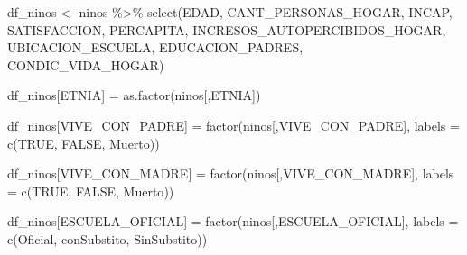 \documentclass[
]{article}
\newenvironment{Shaded}{\begin{snugshade}}{\end{snugshade}}
\newcommand{\AttributeTok}[1]{\textcolor[rgb]{0.77,0.63,0.00}{#1}}
\newcommand{\ConstantTok}[1]{\textcolor[rgb]{0.00,0.00,0.00}{#1}}
\newcommand{\FunctionTok}[1]{\textcolor[rgb]{0.00,0.00,0.00}{#1}}
\newcommand{\NormalTok}[1]{#1}
\newcommand{\OtherTok}[1]{\textcolor[rgb]{0.56,0.35,0.01}{#1}}
\newcommand{\SpecialCharTok}[1]{\textcolor[rgb]{0.00,0.00,0.00}{#1}}
\newcommand{\StringTok}[1]{\textcolor[rgb]{0.31,0.60,0.02}{#1}}
\begin{document}
\begin{Shaded}
\begin{Highlighting}[]
\NormalTok{df\_ninos }\OtherTok{\textless{}{-}}\NormalTok{ ninos }\SpecialCharTok{\%\textgreater{}\%} \FunctionTok{select}\NormalTok{(EDAD, CANT\_PERSONAS\_HOGAR, INCAP, SATISFACCION, }
\NormalTok{                             PERCAPITA, INCRESOS\_AUTOPERCIBIDOS\_HOGAR, }
\NormalTok{                             UBICACION\_ESCUELA, EDUCACION\_PADRES,}
\NormalTok{                             CONDIC\_VIDA\_HOGAR)}

\NormalTok{df\_ninos[}\StringTok{\textquotesingle{}ETNIA\textquotesingle{}}\NormalTok{] }\OtherTok{=} \FunctionTok{as.factor}\NormalTok{(ninos[,}\StringTok{\textquotesingle{}ETNIA\textquotesingle{}}\NormalTok{])}

\NormalTok{df\_ninos[}\StringTok{\textquotesingle{}VIVE\_CON\_PADRE\textquotesingle{}}\NormalTok{] }\OtherTok{=} \FunctionTok{factor}\NormalTok{(ninos[,}\StringTok{\textquotesingle{}VIVE\_CON\_PADRE\textquotesingle{}}\NormalTok{], }\AttributeTok{labels =} \FunctionTok{c}\NormalTok{(}\ConstantTok{TRUE}\NormalTok{, }
                                                                         \ConstantTok{FALSE}\NormalTok{, }
                                                                         \StringTok{\textquotesingle{}Muerto\textquotesingle{}}\NormalTok{))}

\NormalTok{df\_ninos[}\StringTok{\textquotesingle{}VIVE\_CON\_MADRE\textquotesingle{}}\NormalTok{] }\OtherTok{=} \FunctionTok{factor}\NormalTok{(ninos[,}\StringTok{\textquotesingle{}VIVE\_CON\_MADRE\textquotesingle{}}\NormalTok{], }\AttributeTok{labels =} \FunctionTok{c}\NormalTok{(}\ConstantTok{TRUE}\NormalTok{, }
                                                                         \ConstantTok{FALSE}\NormalTok{, }
                                                                         \StringTok{\textquotesingle{}Muerto\textquotesingle{}}\NormalTok{))}

\NormalTok{df\_ninos[}\StringTok{\textquotesingle{}ESCUELA\_OFICIAL\textquotesingle{}}\NormalTok{] }\OtherTok{=} \FunctionTok{factor}\NormalTok{(ninos[,}\StringTok{\textquotesingle{}ESCUELA\_OFICIAL\textquotesingle{}}\NormalTok{], }\AttributeTok{labels =} \FunctionTok{c}\NormalTok{(}\StringTok{\textquotesingle{}Oficial\textquotesingle{}}\NormalTok{, }
                                                              \StringTok{\textquotesingle{}conSubstito\textquotesingle{}}\NormalTok{, }
                                                              \StringTok{\textquotesingle{}SinSubstito\textquotesingle{}}\NormalTok{))}


\end{Highlighting}
\end{Shaded}
\end{document}
